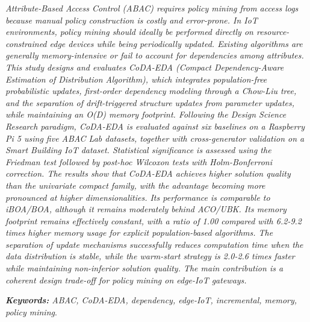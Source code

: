 \justifying

\textit{Attribute-Based Access Control (ABAC) requires policy mining from access logs because manual policy construction is costly and error-prone.
In IoT environments, policy mining should ideally be performed directly on resource-constrained edge devices while being periodically updated.
Existing algorithms are generally memory-intensive or fail to account for dependencies among attributes.
This study designs and evaluates CoDA-EDA (Compact Dependency-Aware Estimation of Distribution Algorithm), which integrates population-free probabilistic updates, first-order dependency modeling through a Chow-Liu tree, and the separation of drift-triggered structure updates from parameter updates, while maintaining an O(D) memory footprint.
Following the Design Science Research paradigm, CoDA-EDA is evaluated against six baselines on a Raspberry Pi 5 using five ABAC Lab datasets, together with cross-generator validation on a Smart Building IoT dataset.
Statistical significance is assessed using the Friedman test followed by post-hoc Wilcoxon tests with Holm-Bonferroni correction.
The results show that CoDA-EDA achieves higher solution quality than the univariate compact family, with the advantage becoming more pronounced at higher dimensionalities.
Its performance is comparable to iBOA/BOA, although it remains moderately behind ACO/UBK.
Its memory footprint remains effectively constant, with a ratio of 1.00 compared with 6.2-9.2 times higher memory usage for explicit population-based algorithms.
The separation of update mechanisms successfully reduces computation time when the data distribution is stable, while the warm-start strategy is 2.0-2.6 times faster while maintaining non-inferior solution quality.
The main contribution is a coherent design trade-off for policy mining on edge-IoT gateways.}


\vspace{14.4pt}
\textit{\textbf{Keywords:} ABAC, CoDA-EDA, dependency, edge-IoT, incremental, memory, policy mining}.
\endgroup